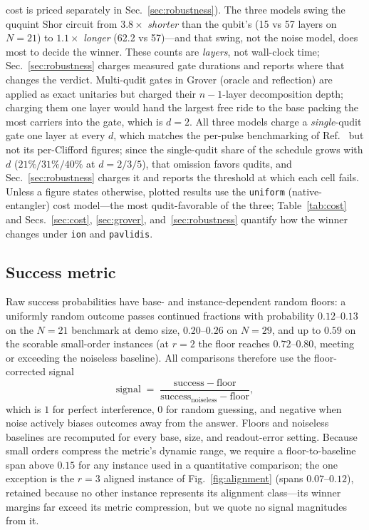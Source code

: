 \documentclass[aps,pra,reprint,superscriptaddress,nofootinbib,floatfix]{revtex4-2}
\begin{document}
cost is priced separately in Sec.~\ref{sec:robustness}). The three
models swing the ququint Shor circuit from $3.8\times$ \emph{shorter}
than the qubit's (15 vs 57 layers on $N=21$) to $1.1\times$
\emph{longer} (62.2 vs 57)---and that swing, not the noise model,
does most to decide the winner. These counts are \emph{layers}, not
wall-clock time; Sec.~\ref{sec:robustness} charges measured gate
durations and reports where that changes the verdict. Multi-qudit gates in Grover (oracle and reflection)
are applied as exact unitaries but charged their $n-1$-layer
decomposition depth; charging them one layer would hand the largest free
ride to the base packing the most carriers into the gate, which is
$d=2$. All three models charge a \emph{single}-qudit gate one layer at
every $d$, which matches the per-pulse benchmarking of
Ref.~\cite{ringbauer2022} but not its per-Clifford figures; since the
single-qudit share of the schedule grows with $d$ ($21\%/31\%/40\%$ at
$d=2/3/5$), that omission favors qudits, and
Sec.~\ref{sec:robustness} charges it and reports the threshold at
which each cell fails. Unless a figure states otherwise, plotted results use the
\texttt{uniform} (native-entangler) cost model---the most
qudit-favorable of the three; Table~\ref{tab:cost} and
Secs.~\ref{sec:cost}, \ref{sec:grover}, and~\ref{sec:robustness}
quantify how the winner changes under \texttt{ion} and
\texttt{pavlidis}.

\subsection{Success metric}

Raw success probabilities have base- and instance-dependent random
floors: a uniformly random outcome passes continued fractions with
probability $0.12$--$0.13$ on the $N=21$ benchmark at demo size,
$0.20$--$0.26$ on $N=29$, and up to $0.59$ on the scorable
small-order instances (at $r=2$ the floor reaches $0.72$--$0.80$,
meeting or exceeding the noiseless baseline).
All comparisons therefore use the floor-corrected signal
\begin{equation}
\mathrm{signal} \;=\;
\frac{\mathrm{success}-\mathrm{floor}}
     {\mathrm{success}_{\mathrm{noiseless}}-\mathrm{floor}},
\end{equation}
which is $1$ for perfect interference, $0$ for random guessing, and
negative when noise actively biases outcomes away from the answer.
Floors and noiseless baselines are recomputed for every base, size, and
readout-error setting. Because small orders compress the metric's
dynamic range, we require a floor-to-baseline span above $0.15$ for
any instance used in a quantitative comparison; the one exception is
the $r=3$ aligned instance of Fig.~\ref{fig:alignment} (spans
$0.07$--$0.12$), retained because no other instance represents its
alignment class---its winner margins far exceed its metric
compression, but we quote no signal magnitudes from it.
\end{document}
